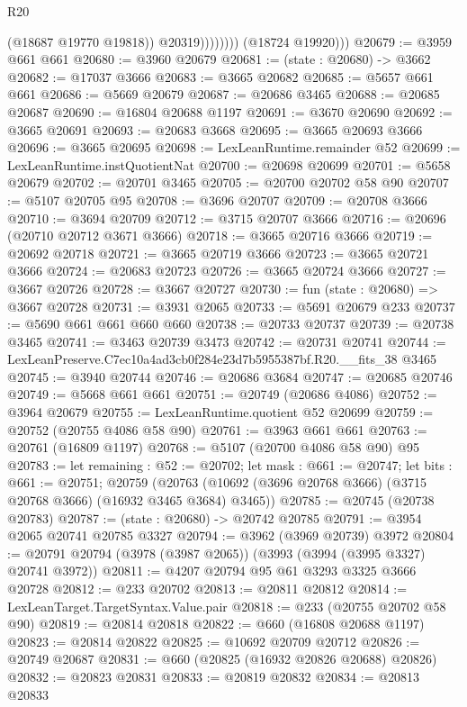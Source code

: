 \begin{lexlean}{R20}
\begin{coremodule}
                          (@18687 @19770 @19818))
                        @20319))))))))
        (@18724 @19920)))
@20679 := @3959 @661 @661
@20680 := @3960 @20679
@20681 := (state : @20680) -> @3662
@20682 := @17037 @3666
@20683 := @3665 @20682
@20685 := @5657 @661 @661
@20686 := @5669 @20679
@20687 := @20686 @3465
@20688 := @20685 @20687
@20690 := @16804 @20688 @1197
@20691 := @3670 @20690
@20692 := @3665 @20691
@20693 := @20683 @3668
@20695 := @3665 @20693 @3666
@20696 := @3665 @20695
@20698 := LexLeanRuntime.remainder @52
@20699 := LexLeanRuntime.instQuotientNat
@20700 := @20698 @20699
@20701 := @5658 @20679
@20702 := @20701 @3465
@20705 := @20700 @20702 @58 @90
@20707 := @5107 @20705 @95
@20708 := @3696 @20707
@20709 := @20708 @3666
@20710 := @3694 @20709
@20712 := @3715 @20707 @3666
@20716 := @20696 (@20710 @20712 @3671 @3666)
@20718 := @3665 @20716 @3666
@20719 := @20692 @20718
@20721 := @3665 @20719 @3666
@20723 := @3665 @20721 @3666
@20724 := @20683 @20723
@20726 := @3665 @20724 @3666
@20727 := @3667 @20726
@20728 := @3667 @20727
@20730 := fun (state : @20680) => @3667 @20728
@20731 := @3931 @2065
@20733 := @5691 @20679 @233
@20737 := @5690 @661 @661 @660 @660
@20738 := @20733 @20737
@20739 := @20738 @3465
@20741 := @3463 @20739 @3473
@20742 := @20731 @20741
@20744 := LexLeanPreserve.C7ec10a4ad3cb0f284e23d7b5955387bf.R20.__fits_38 @3465
@20745 := @3940 @20744
@20746 := @20686 @3684
@20747 := @20685 @20746
@20749 := @5668 @661 @661
@20751 := @20749 (@20686 @4086)
@20752 := @3964 @20679
@20755 := LexLeanRuntime.quotient @52 @20699
@20759 := @20752 (@20755 @4086 @58 @90)
@20761 := @3963 @661 @661
@20763 := @20761 (@16809 @1197)
@20768 := @5107 (@20700 @4086 @58 @90) @95
@20783 := let remaining : @52 := @20702;
  let mask : @661 := @20747;
  let bits : @661 := @20751;
  @20759 (@20763 (@10692 (@3696 @20768 @3666) (@3715 @20768 @3666) (@16932 @3465 @3684) @3465))
@20785 := @20745 (@20738 @20783)
@20787 := (state : @20680) -> @20742 @20785
@20791 := @3954 @2065 @20741 @20785 @3327
@20794 := @3962 (@3969 @20739) @3972
@20804 := @20791 @20794 (@3978 (@3987 @2065)) (@3993 (@3994 (@3995 @3327) @20741 @3972))
@20811 := @4207 @20794 @95 @61 @3293 @3325 @3666 @20728
@20812 := @233 @20702
@20813 := @20811 @20812
@20814 := LexLeanTarget.TargetSyntax.Value.pair
@20818 := @233 (@20755 @20702 @58 @90)
@20819 := @20814 @20818
@20822 := @660 (@16808 @20688 @1197)
@20823 := @20814 @20822
@20825 := @10692 @20709 @20712
@20826 := @20749 @20687
@20831 := @660 (@20825 (@16932 @20826 @20688) @20826)
@20832 := @20823 @20831
@20833 := @20819 @20832
@20834 := @20813 @20833

\end{coremodule}
\end{lexlean}
